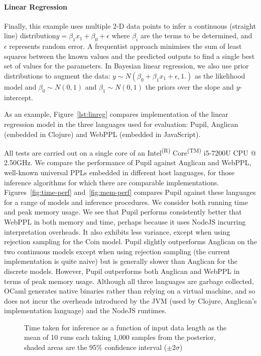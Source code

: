 \documentclass[sigconf]{acmart}
\newcommand{\pupil}{Pupil\xspace}
\begin{document}
\paragraph{Linear Regression}
Finally, this example uses multiple 2-D data points to infer a continuous (straight line) distribution$ y=\beta_1 x_1 + \beta_0 + \epsilon$ where  $\beta_i$ are the terms to be determined, and $\epsilon$ represents random error. A frequentist approach minimises the sum of least squares between the known values and the predicted outputs to find a single best set of values for the parameters. In Bayesian linear regression, we also use prior distributions to augment the data:   $y \sim N(\beta_0 + \beta_1 x_1 + \epsilon, 1.)$ as the likelihood model and $\beta_0 \sim N(0,1)$ and $\beta_1 \sim N(0,1)$ the priors over the slope and $y$-intercept.

As an example, Figure~\ref{lst:linreg} compares implementation of the linear regression model in the three languages used for evaluation: \pupil, Anglican (embedded in Clojure) and WebPPL (embedded in JavaScript).

All tests are carried out on a single core of an Intel\textsuperscript{(R)} Core\textsuperscript{(TM)} i5-7200U CPU @ 2.50GHz. We compare the performance of \pupil against Anglican and WebPPL, well-known universal PPLs embedded in different host languages, for those inference algorithms for which there are comparable implementations. Figures~\ref{fig:time-perf} and~\ref{fig:mem-perf} compares \pupil against these languages for a range of models and inference procedures. We consider both running time and peak memory usage. We see that \pupil performs consistently better that WebPPL in both memory and time, perhaps because it uses NodeJS incurring interpretation overheads. It also exhibits less variance, except when using rejection sampling for the Coin model. \pupil slightly outperforms Anglican on the two continuous models except when using rejection sampling (the current implementation is quite naive) but is generally slower than Anglican for the discrete models. However, \pupil outperforms both Anglican and WebPPL in terms of peak memory usage. Although all three languages are garbage collected, OCaml generates native binaries rather than relying on a virtual machine, and so does not incur the overheads introduced by the JVM (used by Clojure, Anglican's implementation language) and the NodeJS runtimes.

\begin{figure}
  \centering
  
  \caption{\label{fig:time-datasize}
    Time taken for inference as a function of input data length as the mean of 10 runs each taking 1,000 samples from the posterior, shaded areas are the 95\% confidence interval ($\pm 2\sigma$)}
\end{figure}
\end{document}
